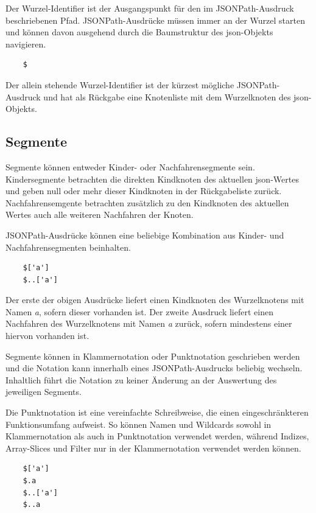 \documentclass[oneside]{ausarbeitung}
\begin{document}
Der Wurzel-Identifier ist der Ausgangspunkt für den im JSONPath-Ausdruck beschriebenen Pfad. JSONPath-Ausdrücke müssen immer an der Wurzel starten und können davon ausgehend durch die Baumstruktur des \ac{json}-Objekts navigieren.
	
\begin{lstlisting}
	$
\end{lstlisting}
	
Der allein stehende Wurzel-Identifier ist der kürzest mögliche JSONPath-Ausdruck und hat als Rückgabe eine Knotenliste mit dem Wurzelknoten des \ac{json}-Objekts.
	
	
	
\subsection{Segmente}
	
Segmente können entweder Kinder- oder Nachfahrensegmente sein. Kindersegmente betrachten die direkten Kindknoten des aktuellen \ac{json}-Wertes und geben null oder mehr dieser Kindknoten in der Rückgabeliste zurück. Nachfahrensemgente betrachten zusätzlich zu den Kindknoten des aktuellen Wertes auch alle weiteren Nachfahren der Knoten.
	
JSONPath-Ausdrücke können eine beliebige Kombination aus Kinder- und Nachfahrensegmenten beinhalten.
	
\begin{lstlisting}
	$['a']
	$..['a']
\end{lstlisting}
	
Der erste der obigen Ausdrücke liefert einen Kindknoten des Wurzelknotens mit Namen \textit{a}, sofern dieser vorhanden ist. Der zweite Ausdruck liefert einen Nachfahren des Wurzelknotens mit Namen \textit{a} zurück, sofern mindestens einer hiervon vorhanden ist.
	
Segmente können in Klammernotation oder Punktnotation geschrieben werden und die Notation kann innerhalb eines JSONPath-Ausdrucks beliebig wechseln. Inhaltlich führt die Notation zu keiner Änderung an der Auswertung des jeweiligen Segments.
	
Die Punktnotation ist eine vereinfachte Schreibweise, die einen eingeschränkteren Funktionsumfang aufweist. So können Namen und Wildcards sowohl in Klammernotation als auch in Punktnotation verwendet werden, während Indizes, Array-Slices und Filter nur in der Klammernotation verwendet werden können.
	
\begin{lstlisting}
	$['a']
	$.a
	$..['a']
	$..a
\end{lstlisting}
	
\end{document}
